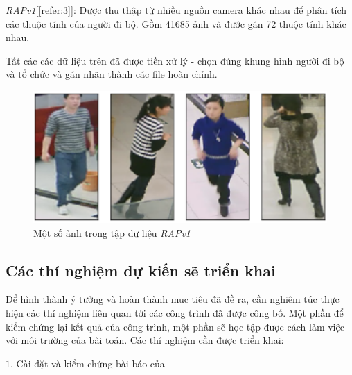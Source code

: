 \textit{RAPv1}[\ref{refer:3}]: Được thu thập từ nhiều nguồn camera khác nhau để phân tích các thuộc tính của người đi bộ. Gồm 41685 ảnh và đước gán 72 thuộc tính khác nhau.

Tất các các dữ liệu trên đã được tiền xử lý - chọn đúng khung hình người đi bộ và tổ chức và gán nhãn thành các file hoàn chỉnh.

\begin{figure}[H]
    \centering
    \includegraphics[width=13cm]{./content/images/sample_rapv1.png}
    \caption{Một số ảnh trong tập dữ liệu \textit{RAPv1}}
    \label{fig:sample-rapv1}
\end{figure}

\subsection{\texorpdfstring{Các thí nghiệm dự kiến sẽ triển khai}{Empty}}
Để hình thành ý tưởng và hoàn thành muc tiêu đã đề ra, cần nghiêm túc thực hiện các thí nghiệm liên quan tới các công trình đã được công bố. Một phần để kiểm chứng lại kết quả của công trình, một phần sẽ học tập được cách làm việc với môi trường của bài toán. Các thí nghiệm cần được triển khai:

$1$. Cài đặt và kiểm chứng bài báo của 
